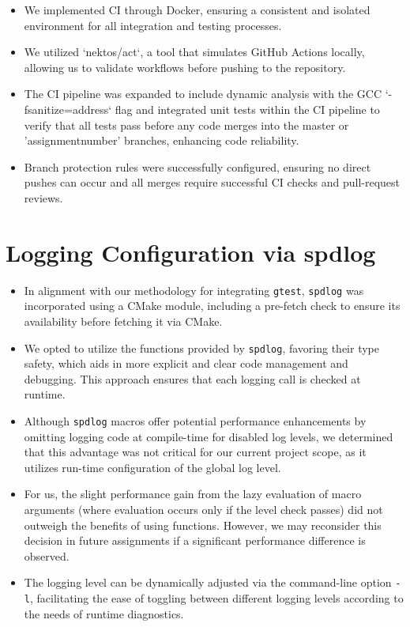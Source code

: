 \documentclass{article}
\begin{document}
\begin{itemize}
    \item We implemented CI through Docker, ensuring a consistent and isolated environment for all integration and testing processes.
    \item We utilized `nektos/act`, a tool that simulates GitHub Actions locally, allowing us to validate workflows before pushing to the repository.
    \item The CI pipeline was expanded to include dynamic analysis with the GCC `-fsanitize=address` flag and integrated unit tests within the CI pipeline to verify that all tests pass before any code merges into the master or 'assignment{number}' branches, enhancing code reliability.
    \item Branch protection rules were successfully configured, ensuring no direct pushes can occur and all merges require successful CI checks and pull-request reviews.
\end{itemize}

\section{Logging Configuration via spdlog}
\label{sec:spd}

\begin{itemize}
    \item In alignment with our methodology for integrating \verb|gtest|, \verb|spdlog| was incorporated using a CMake module, including a pre-fetch check to ensure its availability before fetching it via CMake.
    \item We opted to utilize the functions provided by \verb|spdlog|, favoring their type safety, which aids in more explicit and clear code management and debugging. This approach ensures that each logging call is checked at runtime.
    \item Although \verb|spdlog| macros offer potential performance enhancements by omitting logging code at compile-time for disabled log levels, we determined that this advantage was not critical for our current project scope, as it utilizes run-time configuration of the global log level.
    \item For us, the slight performance gain from the lazy evaluation of macro arguments (where evaluation occurs only if the level check passes) did not outweigh the benefits of using functions. However, we may reconsider this decision in future assignments if a significant performance difference is observed.
    \item The logging level can be dynamically adjusted via the command-line option \texttt{-l}, facilitating the ease of toggling between different logging levels according to the needs of runtime diagnostics.
\end{itemize}
\end{document}
